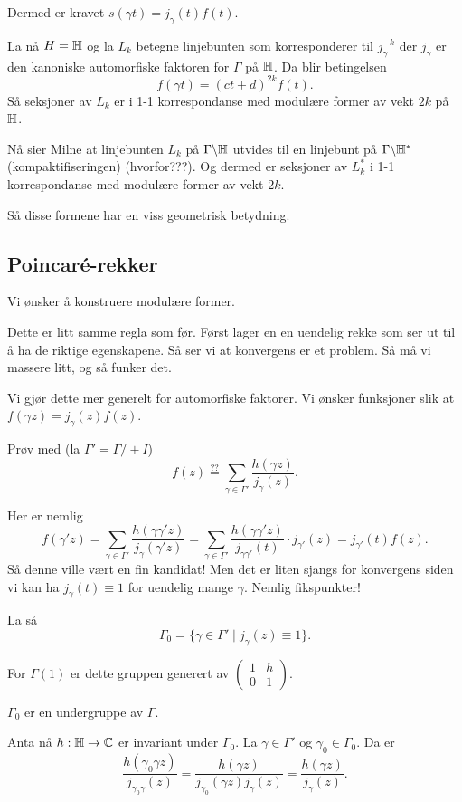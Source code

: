 \documentclass[11pt, english]{article}
\begin{document}
Dermed er kravet $s(\gamma t) = j_\gamma(t) f(t)$.

La nå $H= \mathbb{H}$ og la  $L_k$ betegne linjebunten som korresponderer til $j_\gamma^{-k}$ der $j_\gamma$ er den kanoniske automorfiske faktoren for $\Gamma$ på $\mathbb{H}$. Da blir betingelsen
\[
f(\gamma t) = (ct+d)^{2k} f(t).
\]
Så seksjoner av $L_k$ er i 1-1 korrespondanse med modulære former av vekt $2k$ på $\mathbb{H}$. 

Nå sier Milne at linjebunten $L_k$ på $\Gamma \backslash \mathbb{H}$ utvides til en linjebunt på $\Gamma \backslash \mathbb{H}^\ast$ (kompaktifiseringen) (hvorfor???). Og dermed er seksjoner av $L_k^\ast$ i 1-1 korrespondanse med modulære former av vekt $2k$. 

Så disse formene har en viss geometrisk betydning.

\subsection{Poincaré-rekker}

Vi ønsker å konstruere modulære former.

Dette er litt samme regla som før. Først lager en en uendelig rekke som ser ut til å ha de riktige egenskapene. Så ser vi at konvergens er et problem. Så må vi massere litt, og så funker det.

Vi gjør dette mer generelt for automorfiske faktorer. Vi ønsker funksjoner slik at $f(\gamma z) = j_\gamma (z) f(z)$. 

Prøv med (la $\Gamma' = \Gamma/\pm I$)
\[
f(z) \stackrel{??}{=} \sum_{\gamma \in \Gamma'} \frac{h(\gamma z)}{j_\gamma(z)}.
\]

Her er nemlig
 \[
 f(\gamma' z) = \sum_{\gamma \in \Gamma'} \frac{h(\gamma \gamma' z)}{j_\gamma (\gamma' z)} = \sum_{\gamma \in \Gamma'} \frac{h(\gamma \gamma' z)}{j_{\gamma \gamma'}(t)} \cdot j_{\gamma'} (z)  = j_{\gamma'} (t) f(z).
\] 
Så denne ville vært en fin kandidat! Men det er liten sjangs for konvergens siden vi kan ha $j_\gamma(t) \equiv 1$ for uendelig mange $\gamma$. Nemlig fikspunkter! 

La så 
\[
\Gamma_0 = \{ \gamma \in \Gamma' \mid j_\gamma(z) \equiv 1 \}. 
\]

For $\Gamma(1)$ er dette gruppen generert av $\begin{pmatrix} 1 & h \\ 0 & 1 \end{pmatrix}$.

$\Gamma_0$ er en undergruppe av $\Gamma$.

Anta nå $h:\mathbb{H} \to \mathbb{C}$ er invariant under $\Gamma_0$. La $\gamma \in \Gamma'$ og $\gamma_0 \in \Gamma_0$. Da er 
\[
\frac{h(\gamma_0 \gamma z)}{j_{\gamma_0 \gamma}(z)} = \frac{h(\gamma z)}{j_{\gamma_0}(\gamma z) j_\gamma(z)} = \frac{h(\gamma z)}{j_\gamma(z)}.
\]
\end{document}
